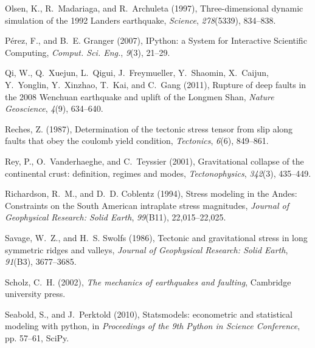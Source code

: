 \documentclass[draft,jgrga]{AGUTeX}
\begin{document}
\begin{article}
\begin{thebibliography}{90}
Olsen, K., R.~Madariaga, and R.~Archuleta (1997), Three-dimensional dynamic
  simulation of the 1992 {L}anders earthquake, \textit{Science},
  \textit{278}(5339), 834--838.

P\'erez, F., and B.~E. Granger (2007), {IP}ython: a {S}ystem for {I}nteractive
  {S}cientific {C}omputing, \textit{{C}omput. {S}ci. {E}ng.}, \textit{9}(3),
  21--29.

Qi, W., Q.~Xuejun, L.~Qigui, J.~Freymueller, Y.~Shaomin, X.~Caijun, Y.~Yonglin,
  Y.~Xinzhao, T.~Kai, and C.~Gang (2011), Rupture of deep faults in the 2008
  {W}enchuan earthquake and uplift of the {L}ongmen {S}han, \textit{Nature
  Geoscience}, \textit{4}(9), 634--640.

Reches, Z. (1987), Determination of the tectonic stress tensor from slip along
  faults that obey the coulomb yield condition, \textit{Tectonics},
  \textit{6}(6), 849--861.

Rey, P., O.~Vanderhaeghe, and C.~Teyssier (2001), Gravitational collapse of the
  continental crust: definition, regimes and modes, \textit{Tectonophysics},
  \textit{342}(3), 435--449.

Richardson, R.~M., and D.~D. Coblentz (1994), Stress modeling in the {A}ndes:
  Constraints on the {S}outh {A}merican intraplate stress magnitudes,
  \textit{Journal of Geophysical Research: Solid Earth}, \textit{99}(B11),
  22,015--22,025.

Savage, W.~Z., and H.~S. Swolfs (1986), Tectonic and gravitational stress in
  long symmetric ridges and valleys, \textit{Journal of Geophysical Research:
  Solid Earth}, \textit{91}(B3), 3677--3685.

Scholz, C.~H. (2002), \textit{The mechanics of earthquakes and faulting},
  Cambridge university press.

Seabold, S., and J.~Perktold (2010), Statsmodels: econometric and statistical
  modeling with python, in \textit{Proceedings of the 9th Python in Science
  Conference}, pp. 57--61, SciPy.


\end{thebibliography}
\end{article}
\end{document}
